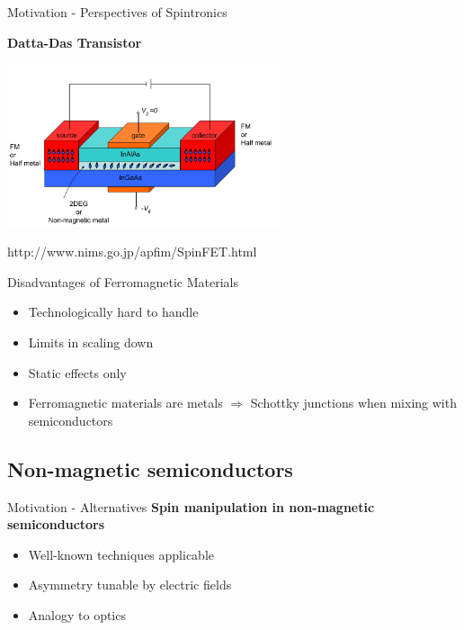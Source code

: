 \documentclass{beamer}
\begin{document}
\begin{frame}{Motivation - Perspectives of Spintronics}
    \begin{center}
    \textbf{Datta-Das Transistor}

    \includegraphics[width=8cm]{SpinFET.png}

    \vfill
    \footnotesize http://www.nims.go.jp/apfim/SpinFET.html
    \end{center}

\end{frame}

\begin{frame}{Disadvantages of Ferromagnetic Materials}

	\begin{itemize}
		\item Technologically hard to handle
        \item Limits in scaling down
        \item Static effects only
		\item Ferromagnetic materials are metals
            $\Rightarrow$ Schottky junctions when mixing with semiconductors
	\end{itemize}
\end{frame}

\subsection{Non-magnetic semiconductors}
\begin{frame}{Motivation - Alternatives}
    \textbf{Spin manipulation in non-magnetic semiconductors}

	\begin{itemize}
		\item Well-known techniques applicable
        \item Asymmetry tunable by electric fields
        \item Analogy to optics
	\end{itemize}
\end{frame}
\end{document}
